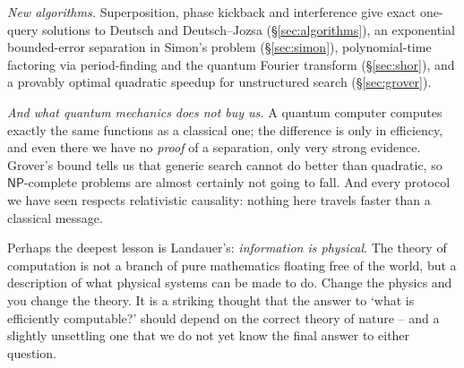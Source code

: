 \documentclass[a4paper]{scrartcl}
\newcommand{\class}[1]{\mathsf{#1}}
\begin{document}
\emph{New algorithms.} Superposition, phase kickback and interference give exact one-query solutions to Deutsch and Deutsch--Jozsa (\S\ref{sec:algorithms}), an exponential bounded-error separation in Simon's problem (\S\ref{sec:simon}), polynomial-time factoring via period-finding and the quantum Fourier transform (\S\ref{sec:shor}), and a provably optimal quadratic speedup for unstructured search (\S\ref{sec:grover}).

\emph{And what quantum mechanics does not buy us.} A quantum computer computes exactly the same functions as a classical one; the difference is only in efficiency, and even there we have no \emph{proof} of a separation, only very strong evidence. Grover's bound tells us that generic search cannot do better than quadratic, so $\class{NP}$-complete problems are almost certainly not going to fall. And every protocol we have seen respects relativistic causality: nothing here travels faster than a classical message.

Perhaps the deepest lesson is Landauer's: \emph{information is physical}. The theory of computation is not a branch of pure mathematics floating free of the world, but a description of what physical systems can be made to do. Change the physics and you change the theory. It is a striking thought that the answer to `what is efficiently computable?' should depend on the correct theory of nature -- and a slightly unsettling one that we do not yet know the final answer to either question.
\end{document}
